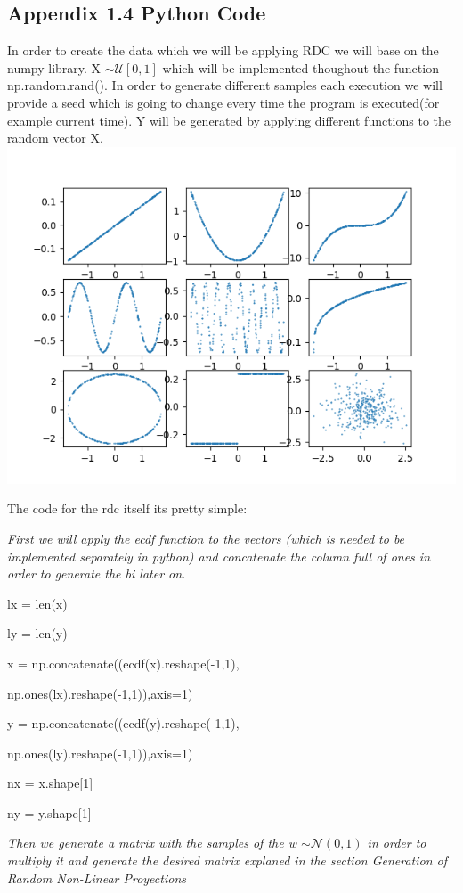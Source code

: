\documentclass[11pt,twoside,a4paper]{article}
\begin{document}
\begin{flushleft}
\subsection*{Appendix 1.4 Python Code}
In order to create the data which we will be applying RDC we will base on the numpy library.
X $\sim \mathcal{U}[0,1]$ which will be implemented thoughout the function np.random.rand(). In order to generate different samples each execution we will provide a seed which is going to change every time the program is executed(for example current time).
Y will be generated by applying different functions to the random vector X.
\includegraphics{Figure_1}

The code for the rdc itself its pretty simple:

\textit{First we will apply the ecdf function to the vectors (which is needed to be implemented separately in python) and concatenate the column full of ones in order to generate the bi later on.}	

	lx = len(x)

	ly = len(y)

	x = np.concatenate((ecdf(x).reshape(-1,1),

		np.ones(lx).reshape(-1,1)),axis=1)

	y = np.concatenate((ecdf(y).reshape(-1,1),

		np.ones(ly).reshape(-1,1)),axis=1)	

	nx = x.shape[1]

	ny = y.shape[1]
	
\textit{Then we generate a matrix with the samples of the w $\sim \mathcal{N}(0,1)$ in order to multiply it and generate the desired matrix explaned in the section Generation of Random Non-Linear Proyections}


\end{flushleft}
\end{document}

